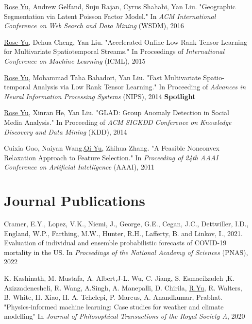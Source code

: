 \documentclass[margin,line]{res}
\begin{document}
\begin{resume}
\begin{enumerate}[label={[C\arabic*]}]
\item \underline{Rose Yu}, Andrew Gelfand, Suju Rajan, Cyrus Shahabi, Yan Liu. "Geographic Segmentation via Latent Poisson Factor Model." In \textit{ACM International Conference on Web Search and Data Mining} (WSDM), 2016 

\item \underline{Rose Yu}, Dehua Cheng, Yan Liu. "Accelerated Online Low Rank Tensor Learning for Multivariate Spatiotemporal Streams." In Proceedings  of  \textit{International Conference on Machine Learning} (ICML), 2015

\item \underline{Rose Yu}, Mohammad Taha Bahadori, Yan Liu. "Fast Multivariate Spatio-temporal Analysis via Low Rank Tensor Learning." In Proceeding of  \textit{Advances in Neural Information Processing Systems} (NIPS), 2014 \textbf{Spotlight}

\item \underline{Rose Yu}, Xinran He, Yan Liu. "GLAD: Group Anomaly Detection in Social Media Analysis." In Proceeding of  \textit{ACM SIGKDD Conference on Knowledge Discovery and Data Mining} (KDD), 2014

\item Cuixia Gao, Naiyan Wang,\underline{Qi Yu}, Zhihua Zhang. "A Feasible Nonconvex Relaxation Approach to Feature Selection." In \textit{Proceeding of 24th AAAI Conference on Artificial Intelligence} (AAAI), 2011 

\end{enumerate}

 
\section{\sc Journal Publications}
\begin{enumerate}[label={[J\arabic*]}]
\item Cramer, E.Y., Lopez, V.K., Niemi, J., George, G.E., Cegan, J.C., Dettwiller, I.D., England, W.P., Farthing, M.W., Hunter, R.H., Lafferty, B. and Linkov, I., 2021. Evaluation of individual and ensemble probabilistic forecasts of COVID-19 mortality in the US. In \textit{Proceedings of the National Academy of Sciences} (PNAS), 2022


\item K. Kashinath, M. Mustafa, A. Albert,J-L. Wu, C. Jiang, S. Esmaeilzadeh ,K. Azizzadenesheli, R. Wang, A.Singh, A. Manepalli, D. Chirila, \underline{R.Yu}, R. Walters, B. White, H. Xiao, H. A. Tchelepi, P. Marcus, A. Anandkumar,  Prabhat. "Physics-informed machine learning: Case studies for weather and climate modelling" In \textit{Journal of Philosophical Transactions of the Royal Society  A}, 2020


\end{enumerate}
\end{resume}
\end{document}
